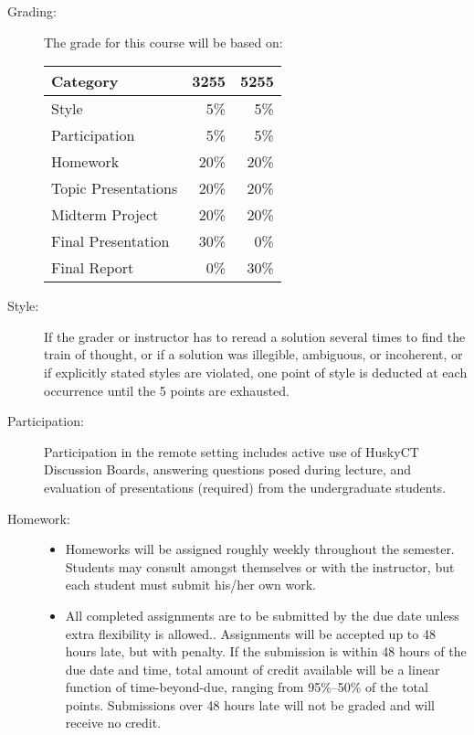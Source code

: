 \documentclass{article}
\begin{document}
\begin{multicols}{2}
\begin{description}
\item[Grading:]
The grade for this course will be based on:
\begin{center}
  \begin{tabular}{lrr}
    \toprule
    Category                & 3255   & 5255\\
    \midrule
    Style                       &  5\%   & 5\%\\
    Participation           &  5\%   & 5\%\\
    Homework              &  20\% & 20\%\\
    Topic Presentations&  20\% & 20\%\\
    Midterm Project       &  20\% & 20\%\\
    Final Presentation    &  30\% & 0\%\\
    Final Report             &  0\% & 30\%\\
    \bottomrule
  \end{tabular}
\end{center} 

\item[Style:]
  If the grader or instructor has to reread a solution several times
  to find the train of thought, or if a solution was illegible,
  ambiguous, or incoherent, or if explicitly stated styles are
  violated, one point of style is deducted at each occurrence until
  the 5 points are exhausted.

\item[Participation:]  Participation in the remote setting includes
  active use of HuskyCT Discussion Boards, answering questions posed
  during lecture, and evaluation of presentations (required) from the
  undergraduate students.

\item[Homework:]\hspace{0pt}
\begin{itemize}
\item Homeworks will be assigned roughly weekly throughout the
  semester.  Students may consult amongst themselves or with the
  instructor, but each student must submit his/her own work.
  
\item All completed assignments are to be submitted by the due date
  unless extra flexibility is allowed.. 
Assignments will be accepted up to 48 hours late, but with penalty.  If the
submission is within 48 hours of the due date and time, total amount of credit
available will be a linear function of time-beyond-due, ranging from 95\%--50\%
of the total points. Submissions over 48 hours late will not be graded and will
receive no credit.
		

\end{itemize}
\end{description}
\end{multicols}
\end{document}
